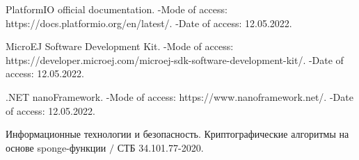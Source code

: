 \begin{thebibliography}{1}
	     PlatformIO official documentation. -Mode of access: \newline
	    https://docs.platformio.org/en/latest/. -Date of access: 12.05.2022.
	    
	     MicroEJ Software Development Kit. -Mode of access: \newline
	    https://developer.microej.com/microej-sdk-software-development-kit/. -Date of access: 12.05.2022.
	    
	     .NET nanoFramework. -Mode of access: \newline
	    https://www.nanoframework.net/. -Date of access: 12.05.2022.
	    
	     Информационные технологии и безопасность. Криптографические алгоритмы 
	    на основе sponge-функции $/$ СТБ 34.101.77-2020.
	 	
	 \end{thebibliography}
